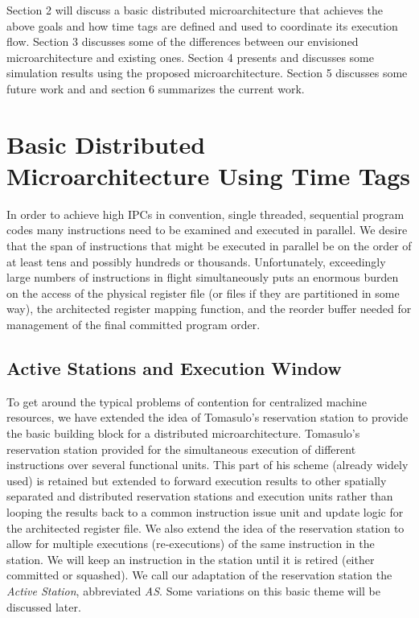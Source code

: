 \documentclass[10pt,dvips]{article}
\begin{document}
Section 2 will discuss a basic distributed microarchitecture that
achieves the above goals and how time tags are defined and used
to coordinate its execution flow.  
Section 3 discusses some of the differences between our envisioned
microarchitecture and existing ones.
Section 4 presents and discusses some simulation results using the proposed
microarchitecture.  Section 5 discusses some future work and
and section 6 summarizes the current work.

\section{Basic Distributed Microarchitecture Using Time Tags}

In order to achieve high IPCs in convention, single threaded, sequential
program codes many instructions need to be examined and executed
in parallel.  We desire that the span of instructions that might be
executed in parallel be on the order of at least tens and possibly hundreds
or thousands.  Unfortunately, exceedingly large numbers of instructions
in flight simultaneously puts an enormous burden on the access of
the physical register file (or files if they are partitioned in some way),
the architected register mapping function, and the reorder buffer 
needed for
management of the final committed program order.

\subsection{Active Stations and Execution Window}
To get around the typical problems of contention for centralized
machine resources, we have extended the idea of Tomasulo's reservation
station \cite{Tom67} to provide the basic building block for a distributed
microarchitecture.  Tomasulo's reservation station provided for the
simultaneous execution of different instructions over several
functional units.  This part of his scheme (already widely used) is
retained but extended to forward execution results to other spatially
separated and distributed reservation stations and execution units
rather than looping the results back to a common instruction issue unit
and update logic for the architected register file.  We also extend the idea
of the reservation station to allow for multiple executions (re-executions)
of the same instruction in the station.  We will keep an 
instruction in the station until it is retired (either committed or 
squashed).  
We call our adaptation of the reservation station the
\textit{Active Station}, abbreviated \textit{AS}.  
Some variations on this basic theme
will be discussed later.
\end{document}
